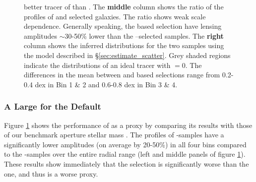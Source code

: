 \documentclass[fleqn,usenatbib,useAMS,english]{mnras}
\begin{document}
\begin{figure}
{          better tracer of \mhalo{} than \mcmodel{}.
          The \textbf{middle} column shows the ratio of the \dsigma{} profiles of \mcmodel{} and 
          selected galaxies.
          The ratio shows weak scale dependence.
          Generally speaking, the \mcmodel{} based selection have lensing amplitudes $\sim$30-50\%
          lower than the --selected samples.
          The \textbf{right} column shows the inferred \mhalo{} distributions for the two samples using the
          model described in \S \ref{sec:estimate_scatter}.
          Grey shaded regions indicate the \mhalo{} distributions of an ideal tracer with
          \sigmh{}$=0$.
          The differences in the mean \mhalo{} between \mcmodel{} and \maper{} based selections
          range from 0.2-0.4 dex in Bin 1 \& 2 and 0.6-0.8 dex in Bin 3 \& 4.
          }
      \label{fig:m100_cmod}
  \end{figure}

\subsubsection{A Large \sigmvir{} for the Default \mcmodel{}}
    \label{sec:m100_cmodel}

    Figure \ref{fig:m100_cmod} shows the performance of \cmodel{} as a \mvir{} proxy by
    comparing its \topn{} results with those of our benchmark aperture stellar mass .
    The \dsigma{} profiles of \mcmodel{}-samples have a significantly lower amplitudes (on average
    by 20-50\%) in all four bins compared to the -samples over the entire radial range (left
    and middle panels of figure \ref{fig:m100_cmod}).
    These results show immediately that the \mcmodel{} selection is significantly worse than the
     one, and thus \mcmodel{} is a worse \mvir{} proxy.
\end{document}
